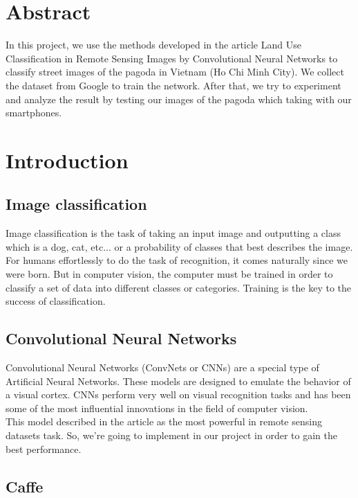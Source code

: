 
\tableofcontents
\thispagestyle{empty}
\clearpage


\section*{Abstract}
In this project, we use the methods developed in the
article Land Use Classification in Remote Sensing Images
by Convolutional Neural Networks \cite{castelluccio2015land} to classify street images of the pagoda in Vietnam (Ho Chi Minh City). We collect the dataset from Google to train the network. After that, we try to experiment and analyze the result by testing our images of the pagoda which taking with our smartphones.

\section{Introduction}
\subsection{Image classification}
Image classification is the task of taking an input image and outputting a class which is a dog, cat, etc... or a probability of classes that best describes the image. For humans effortlessly to do the task of recognition, it comes naturally since we were born. But in computer vision, the computer must be trained in order to classify a set of data into different classes or categories. Training is the key to the success of classification.\\
\subsection{Convolutional Neural Networks}
Convolutional Neural Networks (ConvNets or CNNs) are a special type of Artificial Neural Networks. These models are designed to emulate the behavior of a visual cortex. CNNs perform very well on visual recognition tasks and has been some of the most influential innovations in the field of computer vision.\\
This model described in the article\cite{castelluccio2015land} as the most powerful in remote sensing datasets task. So, we're going to implement in our project in order to gain the best performance. 

\subsection{Caffe}

